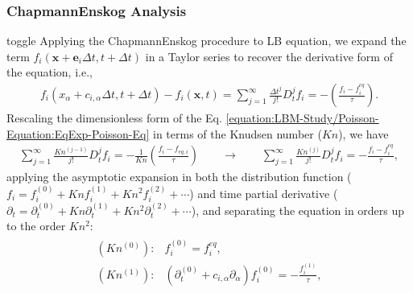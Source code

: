 \documentclass[letterpaper,10pt,english,openany,oneside]{jupyterBook}
\begin{document}
\subsubsection{Chapmann\sphinxhyphen{}Enskog Analysis}
\label{\detokenize{LBM-Study/Poisson-Equation:chapmann-enskog-analysis}}
\begin{sphinxuseclass}{toggle}
\sphinxAtStartPar
Applying the Chapmann\sphinxhyphen{}Enskog procedure to LB equation, we expand the term \(f_{i}\left(\boldsymbol{x}+\boldsymbol{e}_i \Delta t, t+\Delta t\right)\) in a Taylor series to recover the derivative form of the equation, i.e.,
\begin{equation}\label{equation:LBM-Study/Poisson-Equation:EqExp-Poisson-Eq}
\begin{split}
f_{i}\left(x_{\alpha} + c_{i,\alpha} \Delta t, t+\Delta t\right)- f_{i}(\boldsymbol{x}, t)=\displaystyle\sum_{j=1}^{\infty}\frac{\Delta t^{j}}{j!}D_{t}^{j}f_{i}= -\left( \frac{ f_{i} - f_{i}^{eq} }{ \tau } \right).
\end{split}
\end{equation}
\sphinxAtStartPar
Rescaling the dimensionless form of the Eq. \eqref{equation:LBM-Study/Poisson-Equation:EqExp-Poisson-Eq} in terms of the Knudsen number (\(Kn\)), we have
\begin{equation*}
\begin{split}
\displaystyle \sum^{\infty}_{j=1}  \frac{Kn^{(j-1)}}{j!} D_{t}^{j} f_{i} = - \frac{1}{Kn}\left( \frac{ f_{i} - f_{eq,i} }{ \tau } \right) \quad \quad \rightarrow \quad \quad \displaystyle \sum^{\infty}_{j=1}  \frac{Kn^{(j)}}{j!} D_{t}^{j} f_{i} = -  \frac{ f_{i} - f_{i}^{eq} }{ \tau },
\end{split}
\end{equation*}
\sphinxAtStartPar
applying the asymptotic expansion in both the distribution function (\(f_{i}=f_{i}^{(0)}+Kn f_{i}^{(1)} + Kn^{2} f_{i}^{(2)}+\cdots\)) and time partial derivative (\(\partial_{t}=\partial_{t}^{(0)}+ Kn \partial_{t}^{(1)}+Kn^{2} \partial_{t}^{(2)}+\cdots\)), and separating the equation in orders up to the order \(Kn^{2}\):
\begin{equation}\label{equation:LBM-Study/Poisson-Equation:Chap-Kn-Poisson-Eq}
\begin{split}
\begin{array}{ll}
    (Kn^{(0)}):& f_{i}^{(0)}= f_{i}^{eq},\\
    (Kn^{(1)}):& \left( \partial_{t}^{(0)} + c_{i,\alpha}\partial_{\alpha} \right)f_{i}^{(0)}= - \displaystyle\frac{ f_{i}^{(1)} }{ \tau } , \\

\end{array}
\end{split}
\end{equation}
\end{sphinxuseclass}
\end{document}
